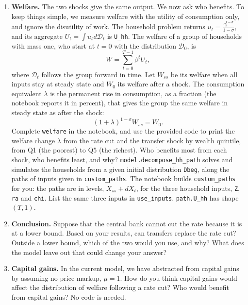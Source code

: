 \begin{enumerate}
\item \textbf{Welfare.} The two shocks give the same output. We now ask who benefits. To keep things simple, we measure welfare with the utility of consumption only, and ignore the disutility of work. The household problem returns $u_{t}=\frac{c_{t}^{1-\sigma}}{1-\sigma}$, and its aggregate $U_{t}=\int u_{t}d\mathcal{D}_{t}$ is \texttt{U\_hh}. The welfare of a group of households with mass one, who start at $t=0$ with the distribution $\mathcal{D}_{0}$, is
$$W=\sum_{t=0}^{T-1}\beta^{t}U_{t},$$
where $\mathcal{D}_{t}$ follows the group forward in time. Let $W_{ss}$ be its welfare when all inputs stay at steady state and $W_{0}$ its welfare after a shock. The consumption equivalent $\lambda$ is the permanent rise in consumption, as a fraction (the notebook reports it in percent), that gives the group the same welfare in steady state as after the shock:
$$(1+\lambda)^{1-\sigma}W_{ss}=W_{0}.$$
Complete \texttt{welfare} in the notebook, and use the provided code to print the welfare change $\lambda$ from the rate cut and the transfer shock by wealth quintile, from Q1 (the poorest) to Q5 (the richest). Who benefits most from each shock, who benefits least, and why? \texttt{model.decompose\_hh\_path} solves and simulates the households from a given initial distribution \texttt{Dbeg}, along the paths of inputs given in \texttt{custom\_paths}. The notebook builds \texttt{custom\_paths} for you: the paths are in levels, $X_{ss}+dX_{t}$, for the three household inputs, \texttt{Z}, \texttt{ra} and \texttt{chi}. List the same three inputs in \texttt{use\_inputs}. \texttt{path.U\_hh} has shape $(T,1)$.

\item \textbf{Conclusion.} Suppose that the central bank cannot cut the rate because it is at a lower bound. Based on your results, can transfers replace the rate cut? Outside a lower bound, which of the two would you use, and why? What does the model leave out that could change your answer?

\item \textbf{Capital gains.} In the current model, we have abstracted from capital gains by assuming no price markup, $\mu=1$. How do you think capital gains would affect the distribution of welfare following a rate cut? Who would benefit from capital gains? No code is needed.

\end{enumerate}
